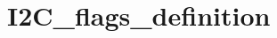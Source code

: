 \hypertarget{group___i2_c__flags__definition}{\section{I2\-C\-\_\-flags\-\_\-definition}
\label{group___i2_c__flags__definition}
}
